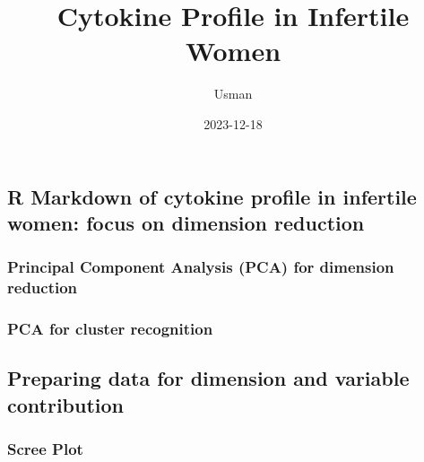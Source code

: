 \documentclass[
]{article}
\title{Cytokine Profile in Infertile Women}
\author{Usman}
\date{2023-12-18}
\begin{document}
\maketitle

{
\setcounter{tocdepth}{2}
\tableofcontents
}
\hypertarget{r-markdown-of-cytokine-profile-in-infertile-women-focus-on-dimension-reduction}{%
\subsection{\texorpdfstring{\textbf{R Markdown of cytokine profile in
infertile women: focus on dimension
\n reduction}}{R Markdown of cytokine profile in infertile women: focus on dimension reduction}}\label{r-markdown-of-cytokine-profile-in-infertile-women-focus-on-dimension-reduction}}

\hypertarget{principal-component-analysis-pca-for-dimension-reduction}{%
\subsubsection{\texorpdfstring{\textbf{Principal Component Analysis
(PCA) for dimension
reduction}}{Principal Component Analysis (PCA) for dimension reduction}}\label{principal-component-analysis-pca-for-dimension-reduction}}

\hypertarget{pca-for-cluster-recognition}{%
\subsubsection{\texorpdfstring{\textbf{PCA for cluster
recognition}}{PCA for cluster recognition}}\label{pca-for-cluster-recognition}}

\hypertarget{preparing-data-for-dimension-and-variable-contribution}{%
\subsection{\texorpdfstring{\textbf{Preparing data for dimension and
variable
contribution}}{Preparing data for dimension and variable contribution}}\label{preparing-data-for-dimension-and-variable-contribution}}

\hypertarget{scree-plot}{%
\subsubsection{\texorpdfstring{\textbf{Scree
Plot}}{Scree Plot}}\label{scree-plot}}
\end{document}
